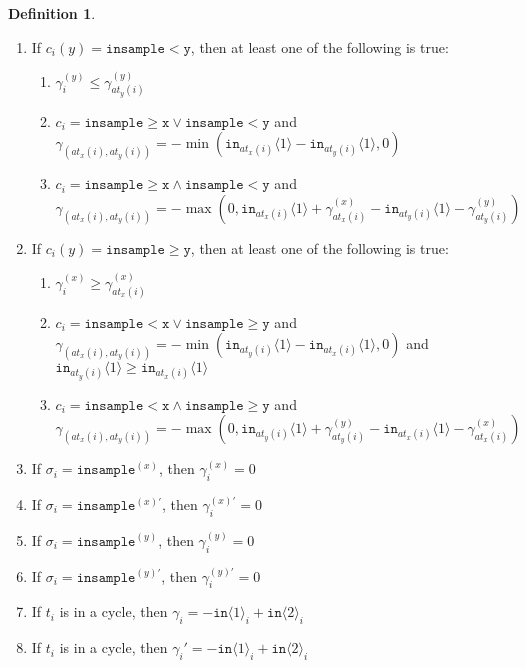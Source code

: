 \documentclass[12pt]{article}
\newcommand{\gguard}[1][x]{\texttt{insample}\geq #1}
\newcommand{\lguard}[1][x]{\texttt{insample} < #1}
\newcommand{\brangle}[1]{\langle #1 \rangle}
\theoremstyle{definition}
\newtheorem{defn}[thm]{Definition}
\begin{document}
\begin{defn}
\begin{enumerate}
\begin{enumerate}
        \end{enumerate}
        \item If $c_i(y) = \lguard[\texttt{y}]$, then at least one of the following is true: \begin{enumerate}
            \item $\gamma_i^{(y)}\leq \gamma^{(y)}_{at_y(i)}$
            \item $c_i = \gguard[\texttt{x}]\lor\lguard[\texttt{y}]$ and $\gamma_{(at_x(i), at_y(i))} = -\min(\texttt{in}_{at_x(i)}\brangle{1}-\texttt{in}_{at_y(i)}\brangle{1}, 0)$
            \item $c_i = \gguard[\texttt{x}]\land\lguard[\texttt{y}]$ and $\gamma_{(at_x(i), at_y(i))} = -\max(0, \texttt{in}_{at_x(i)}\brangle{1}+ \gamma_{at_x(i)}^{(x)}-\texttt{in}_{at_y(i)}\brangle{1}-\gamma_{at_y(i)}^{(y)})$
        \end{enumerate}
        \item If $c_i(y) = \gguard[\texttt{y}]$, then at least one of the following is true: \begin{enumerate}
            \item $\gamma_i^{(x)}\geq \gamma^{(x)}_{at_x(i)}$
            \item $c_i = \lguard[\texttt{x}]\lor\gguard[\texttt{y}]$ and $\gamma_{(at_x(i), at_y(i))} = -\min(\texttt{in}_{at_y(i)}\brangle{1}-\texttt{in}_{at_x(i)}\brangle{1}, 0)$ and $\texttt{in}_{at_y(i)}\brangle{1}\geq \texttt{in}_{at_x(i)}\brangle{1}$
            \item $c_i = \lguard[\texttt{x}]\land\gguard[\texttt{y}]$ and $\gamma_{(at_x(i), at_y(i))} = -\max(0, \texttt{in}_{at_y(i)}\brangle{1}+ \gamma_{at_y(i)}^{(y)}-\texttt{in}_{at_x(i)}\brangle{1}-\gamma_{at_x(i)}^{(x)})$
        \end{enumerate}
        \item If $\sigma_i = \texttt{insample}^{(x)}$, then $\gamma_i^{(x)}=0$
        \item If $\sigma_i = \texttt{insample}^{(x)\prime}$, then $\gamma_i^{(x)\prime}=0$
        \item If $\sigma_i = \texttt{insample}^{(y)}$, then $\gamma_i^{(y)}=0$
        \item If $\sigma_i = \texttt{insample}^{(y)\prime}$, then $\gamma_i^{(y)\prime}=0$
        \item If $t_i$ is in a cycle, then $\gamma_i = -\texttt{in}\brangle{1}_i+\texttt{in}\brangle{2}_i$
        \item If $t_i$ is in a cycle, then $\gamma_i' = -\texttt{in}\brangle{1}_i+\texttt{in}\brangle{2}_i$

\end{enumerate}
\end{defn}
\end{document}
